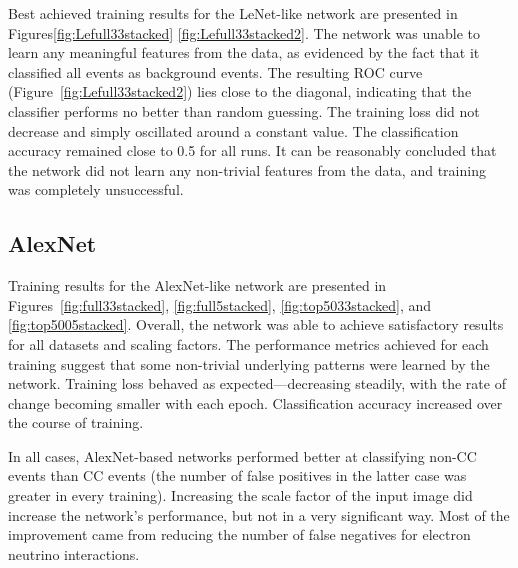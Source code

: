 \documentclass{pracalicmgr}
\begin{document}
    


Best achieved training results for the LeNet-like network are presented in Figures\ref{fig:Lefull33stacked} \ref{fig:Lefull33stacked2}. The network was unable to learn any meaningful features from the data, as evidenced by the fact that it classified all events as background events. The resulting ROC curve (Figure~\ref{fig:Lefull33stacked2}) lies close to the diagonal, indicating that the classifier performs no better than random guessing. The training loss did not decrease and simply oscillated around a constant value. The classification accuracy remained close to 0.5 for all runs. It can be reasonably concluded that the network did not learn any non-trivial features from the data, and training was completely unsuccessful.

\subsection{AlexNet}

Training results for the AlexNet-like network are presented in Figures~\ref{fig:full33stacked}, \ref{fig:full5stacked}, \ref{fig:top5033stacked}, and \ref{fig:top5005stacked}. Overall, the network was able to achieve satisfactory results for all datasets and scaling factors. The performance metrics achieved for each training suggest that some non-trivial underlying patterns were learned by the network. Training loss behaved as expected—decreasing steadily, with the rate of change becoming smaller with each epoch. Classification accuracy increased over the course of training.

In all cases, AlexNet-based networks performed better at classifying non-CC events than CC events (the number of false positives in the latter case was greater in every training). Increasing the scale factor of the input image did increase the network's performance, but not in a very significant way. Most of the improvement came from reducing the number of false negatives for electron neutrino interactions.
\end{document}
